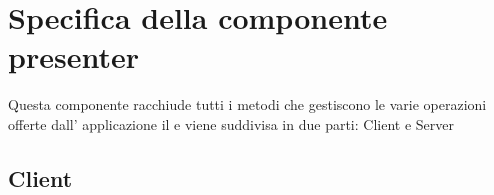 \section{Specifica della componente presenter}
Questa componente racchiude tutti i metodi che gestiscono le varie operazioni offerte dall' applicazione il \progetto e viene suddivisa in due parti: Client e Server
\subsection{Client}